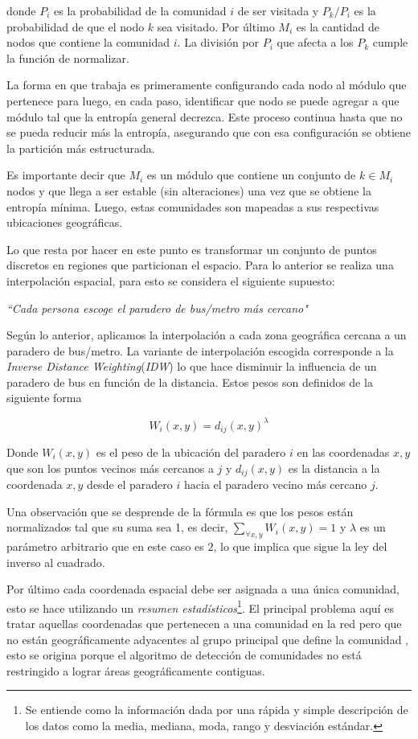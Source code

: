 \documentclass[12pt]{article}
\begin{document}
donde $P_i$	es la probabilidad de la comunidad $i$ de ser visitada y $P_k/P_i$ es la probabilidad de que el nodo $k$ sea visitado. Por último $M_i$ es la cantidad de nodos que contiene la comunidad $i$. La división por $P_i$ que afecta a los $P_k$ cumple la función de normalizar.

La forma en que trabaja es primeramente configurando cada nodo al módulo que pertenece para luego, en cada paso, identificar que nodo se puede agregar a que módulo tal que la entropía general decrezca. Este proceso continua hasta que no se pueda reducir más la entropía, asegurando que con esa configuración se obtiene la partición más estructurada.

Es importante decir que $M_i$ es un módulo que contiene un conjunto de $k \in M_i$ nodos y que llega a ser estable (sin alteraciones) una vez que se obtiene la entropía mínima. Luego, estas comunidades son mapeadas a sus respectivas ubicaciones geográficas.

Lo que resta por hacer en este punto es transformar un conjunto de puntos discretos en regiones que particionan el espacio. Para lo anterior se realiza una interpolación espacial, para esto se considera el siguiente supuesto:

\begin{center}
	\textit{``Cada persona escoge el paradero de bus/metro más cercano"}
\end{center} 

Según lo anterior, aplicamos la interpolación a cada zona geográfica cercana a un paradero de bus/metro. La variante de interpolación escogida corresponde a la \textit{Inverse Distance Weighting}(\textit{IDW}) lo que hace disminuir la influencia de un paradero de bus en función de la distancia. Estos pesos son definidos de la siguiente forma 

$$
	W_i(x,y) = d_{ij} (x,y)^\lambda
$$

Donde $W_i(x,y)$ es el peso de la ubicación del paradero $i$ en las coordenadas $x,y$ que son los puntos vecinos más cercanos a $j$ y $d_{ij} (x,y)$ es la distancia a la coordenada $x,y$ desde el paradero $i$ hacia el paradero vecino más cercano $j$.

Una observación que se desprende de la fórmula es que los pesos están normalizados tal que su suma sea 1, es decir, $\sum_{\forall x,y} W_i (x,y)=1$ y $\lambda$ es un parámetro arbitrario que en este caso es $2$, lo que implica que sigue la ley del inverso al cuadrado.

Por último cada coordenada espacial debe ser asignada a una única comunidad, esto se hace utilizando un  \textit{resumen estadísticos}\footnote{Se entiende como la información dada por una rápida y simple descripción de los datos como la media, mediana, moda, rango y desviación estándar.}. El principal problema aquí es tratar aquellas coordenadas que pertenecen a una comunidad en la red pero que no están geográficamente adyacentes al grupo principal que define la comunidad	, esto se origina porque el algoritmo de detección de comunidades no está restringido a lograr áreas geográficamente contiguas.
\end{document}
